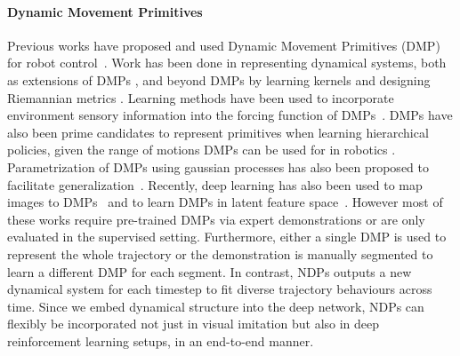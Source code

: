\documentclass{article}
\newcommand{\ours}{NDPs\xspace}
\begin{document}
\paragraph{Dynamic Movement Primitives} Previous works have proposed and used Dynamic Movement Primitives (DMP) \cite{schaal2006dynamic,isprt2012dmp,prada2013dmp} for robot control~\cite{mulling2013learning, peters2003reinforcement, kormushev2010robot}.
Work has been done in representing dynamical systems, both as extensions of DMPs \cite{conkey2019promp,Calinon2010LearningbasedCS,Calinon2016ATO,ude2010task}, and beyond DMPs by learning kernels \cite{huang2019kmp} and designing Riemannian metrics \cite{ratliff2018riemannian}.
Learning methods have been used to incorporate environment sensory information into the forcing function of DMPs~\cite{sutanto2018learning,rai2017learning}.
DMPs have also been prime candidates to represent primitives when learning hierarchical policies, given the range of motions DMPs can be used for in robotics \cite{daniel2016hreps, stulp2012sequences, kober2009learning, pastor2011skill}. Parametrization of DMPs using gaussian processes has also been proposed to facilitate generalization~\cite{ude2010task,pervez2018learning}. Recently, deep learning has also been used to map images to DMPs~\cite{pahic2018deepenc} and to learn DMPs in latent feature space~\cite{chen2016dynamic}. However most of these works require pre-trained DMPs via expert demonstrations or are only evaluated in the supervised setting. Furthermore, either a single DMP is used to represent the whole  trajectory or the demonstration is manually segmented to learn a different DMP for each segment. In contrast, \ours outputs a new dynamical system for each timestep to fit diverse trajectory behaviours across time. Since we embed dynamical structure into the deep network, \ours can flexibly be incorporated not just in visual imitation but also in deep reinforcement learning setups, in an end-to-end manner.
\end{document}
